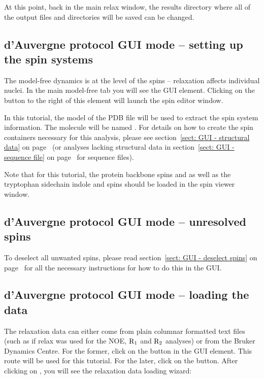 \begin{htmlonly}
\begin{htmlonly}
At this point, back in the main relax window, the results directory where all of the output files and directories will be saved can be changed.



\subsection{d'Auvergne protocol GUI mode -- setting up the spin systems}

The model-free dynamics is at the level of the spins -- relaxation affects individual nuclei.  In the main model-free tab you will see the  GUI element.  Clicking on the  button to the right of this element will launch the spin editor window.

In this tutorial, the  model of the PDB file  will be used to extract the spin system information.  The molecule will be named .  For details on how to create the spin containers necessary for this analysis, please see section~\ref{sect: GUI - structural data} on page~\pageref{sect: GUI - structural data} (or analyses lacking structural data in section~\ref{sect: GUI - sequence file} on page~\pageref{sect: GUI - sequence file} for sequence files).

Note that for this tutorial, the protein backbone spins  and  as well as the tryptophan sidechain indole  and  spins should be loaded in the spin viewer window.



\subsection{d'Auvergne protocol GUI mode -- unresolved spins}

To deselect all unwanted spins, please read section~\ref{sect: GUI - deselect spins} on page~\pageref{sect: GUI - deselect spins} for all the necessary instructions for how to do this in the GUI.



\subsection{d'Auvergne protocol GUI mode -- loading the data}

The relaxation data can either come from plain columnar formatted text files (such as if relax was used for the NOE, $\mathrm{R}_1$ and $\mathrm{R}_2$ analyses) or from the Bruker Dynamics Centre.  For the former, click on the  button in the  GUI element.  This route will be used for this tutorial.  For the later, click on the  button.  After clicking on , you will see the relaxation data loading wizard:


\end{htmlonly}
\end{htmlonly}
